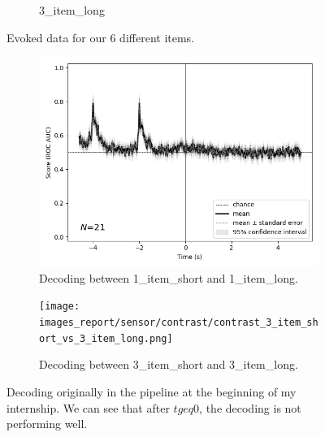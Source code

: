 \begin{figure}[htb]
\begin{subfigure}{0.25\textwidth}
        \caption{3\_item\_long}
        \label{fig:3_item_long}
    \end{subfigure}
    \caption[Evoked data for our 6 different items.]%
    {Evoked data for our 6 different items.}
    \label{fig:Evoked_data}
\end{figure}


\begin{figure}
    \centering
    \begin{subfigure}{.5\textwidth}
        \centering
        \includegraphics[width=1.\linewidth]{images_report/sensor/contrast/contrast_1_item_short_vs_1_item_long.png}
        \caption{Decoding between 1\_item\_short and 1\_item\_long.}
        \label{fig:decoding_1_item}
    \end{subfigure}%
    \begin{subfigure}{.5\textwidth}
        \centering
        \texttt{[image: images\_report/sensor/contrast/contrast\_3\_item\_short\_vs\_3\_item\_long.png]}
        \caption{Decoding between 3\_item\_short and 3\_item\_long.}
        \label{fig:decoding_3_item}
    \end{subfigure}
    \caption[Decoding originally in the pipeline]%
    {Decoding originally in the pipeline at the beginning of my internship. We can see that after $t geq 0$, the decoding is not performing well.}
    \label{fig:decoding_initial}
\end{figure}

